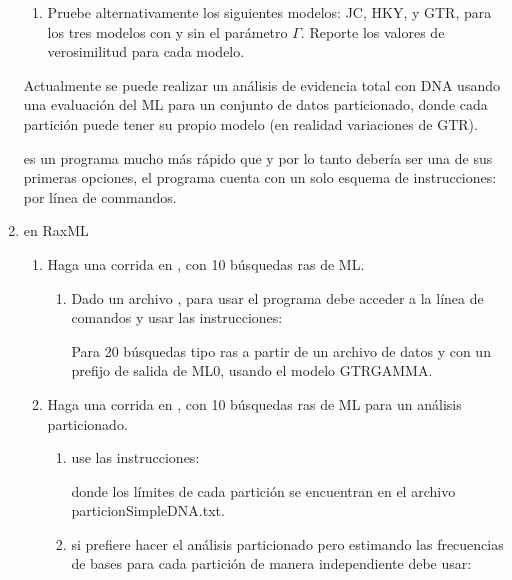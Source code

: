 \begin{enumerate}
\begin{enumerate}
		\item Pruebe alternativamente los siguientes modelos: JC, HKY, y GTR, para los tres modelos con y sin el par\'ametro $\Gamma$. Reporte los valores de verosimilitud para cada modelo.


	\end{enumerate}


Actualmente se puede realizar un an\'alisis de evidencia total con DNA usando una evaluaci\'on del ML para un conjunto de datos particionado, donde cada partici\'on puede tener su propio modelo (en realidad variaciones de GTR).

 es un programa mucho m\'as r\'apido que  y por lo tanto deber\'ia ser una de sus primeras opciones, el programa cuenta con un solo esquema de instrucciones: por l\'inea de commandos.

\item{en RaxML}

	\begin{enumerate}
		\item Haga una corrida en , con 10 b\'usquedas ras de ML.
		\begin{enumerate}
			\item Dado un archivo , para usar el programa debe acceder a la l\'inea de comandos y usar las instrucciones:

			Para 20 b\'usquedas tipo ras a partir de un archivo de datos   y con un prefijo de salida de ML0, usando el modelo GTRGAMMA.

			\end{enumerate}

		\item Haga una corrida en , con 10 b\'usquedas ras de ML para un an\'alisis particionado.
		\begin{enumerate}\begin{enumerate}
			\item  use las instrucciones: 

			donde los l\'imites de cada partici\'on se encuentran en el archivo particionSimpleDNA.txt.

			\item si prefiere hacer el an\'alisis particionado pero estimando las frecuencias de bases para cada partici\'on de manera independiente debe usar:


\end{enumerate}
\end{enumerate}
\end{enumerate}
\end{enumerate}
